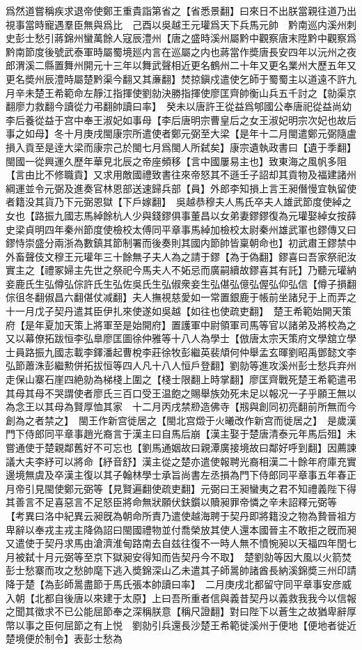爲然道嘗稱疾求退帝使鄭王重貴詣第省之【省悉景翻】曰來日不出朕當親往道乃出視事當時寵遇羣臣無與爲比　己酉以吳越王元瓘爲天下兵馬元帥　黔南巡内溪州刺史彭士愁引蔣錦州蠻萬餘人寇辰澧州【唐之盛時溪州屬黔中觀察唐末陞黔中觀察爲黔南節度後號武泰軍時屬蜀境廵内言在巡屬之内也蔣當作奬唐長安四年以沅州之夜郎渭溪二縣置舞州開元十三年以舞武聲相近更名鶴州二十年又更名業州大歷五年又更名奬州辰澧時屬楚黔渠今翻又其亷翻】焚掠鎭戍遣使乞師于蜀蜀主以道遠不許九月辛未楚王希範命左靜江指揮使劉勍決勝指揮使廖匡齊帥衡山兵五千討之【勍渠京翻廖力救翻今讀從力弔翻帥讀曰率】　癸未以唐許王從益爲郇國公奉唐祀從益尚幼李后養從益于宫中奉王淑妃如事母【李后唐明宗曹皇后之女王淑妃明宗次妃也故后事之如母】冬十月庚戌閩康宗所遣使者鄭元弼至大梁【是年十二月閩遣鄭元弼隨盧損入貢至是逹大梁而康宗己於閩七月爲閩人所弑矣】康宗遺執政書曰【遺于季翻】閩國一從興運久歷年華見北辰之帝座頻移【言中國屢易主也】致東海之風帆多阻【言由比不修職貢】又求用敵國禮致書往來帝怒其不遜壬子詔却其貢物及福建諸州綱運並令元弼及進奏官林恩部送速歸兵部【員】外郎李知損上言王昶僭慢宜執留使者籍没其貨乃下元弼恩獄【下戶嫁翻】　吳越恭穆夫人馬氏卒夫人雄武節度使綽之女也【路振九國志馬綽餘杭人少與錢鏐俱事董昌以女弟妻鏐鏐復為元瓘娶綽女按薛史梁貞明四年秦州節度使檢校太傅同平章事馬綽加檢校太尉秦州雄武軍也鏐傳又曰鏐恃崇盛分兩浙為數鎮其節制署而後奏則其國内節帥皆稟朝命也】初武肅王鏐禁中外畜聲伎文穆王元瓘年三十餘無子夫人為之請于鏐【為于偽翻】鏐喜曰吾家祭祀汝實主之【禮冢婦主先世之祭祀今馬夫人不妬忌而廣嗣續故鏐喜其有託】乃聽元瓘納妾鹿氏生弘僔弘倧許氏生弘佐吳氏生弘俶衆妾生弘偡弘億弘偓弘仰弘信【僔子損翻倧徂冬翻俶昌六翻偡仗减翻】夫人撫視慈愛如一常置銀鹿于帳前坐諸兒于上而弄之　十一月戊子契丹遣其臣伊扎來使遂如吳越【如往也使疏吏翻】　楚王希範始開天策府【是年夏加天策上將軍至是始開府】置護軍中尉領軍司馬等官以諸弟及將校為之又以幕僚拓跋恒李弘臯廖匡圖徐仲雅等十八人為學士【倣唐太宗天策府文學舘立學士員路振九國志載李鐸潘起曹梲李莊徐牧彭繼英裴頏何仲舉孟玄暉劉昭禹鄧懿文李弘節蕭洙彭繼勲併拓拔恒等四人凡十八人恒戶登翻】劉勍等進攻溪州彭士愁兵弃州走保山寨石崖四絶勍為梯棧上圍之【棧士限翻上時掌翻】廖匡齊戰死楚王希範遣弔其母其母不哭謂使者廖氏三百口受王温飽之賜舉族効死未足以報况一子乎願王無以為念王以其母為賢厚恤其家　十二月丙戌禁剙造佛寺【剏與創同初亮翻前所無而今創為之者禁之】　閩王作新宫徙居之【閩北宫燬于火曦改作新宫而徙居之】　是歲漢門下侍郎同平章事趙光裔言于漢主曰自馬后崩【漢主娶于楚唐清泰元年馬后殂】未嘗通使于楚親鄰舊好不可忘也【劉馬通姻故曰親潭廣接境故曰鄰好呼到翻】因薦諫議大夫李紓可以將命【紓音舒】漢主從之楚亦遣使報聘光裔相漢二十餘年府庫充實邊境無虞及卒漢主復以其子翰林學士承旨尚書左丞損為門下侍郎同平章事五年春正月帝引見閩使鄭元弼等【見賢遍翻使疏吏翻】元弼曰王昶蠻夷之君不知禮義陛下得其善言不足喜惡言不足怒臣將命無狀願伏鈇鑕以贖昶罪帝憐之辛未詔釋元弼等　【考異曰洛中紀異云昶旣為朝命所責乃遣使越海聘于契丹即將籍没之物為贄晉祖方卑辭以奉戎主戎主降偽詔曰閩國禮物並付喬榮放其使人還本國晉主不敢拒之旣而昶又遣使于契丹求馬由滄濟淮甸路南去自兹往復不一時人無不憤惋昶以天福四年閏七月被弑十月元弼等至京下獄昶安得知而告契丹今不取】　楚劉勍等因大風以火箭焚彭士愁寨而攻之愁帥麾下逃入奬錦深山乙未遣其子師暠帥諸酋長納溪錦奬三州印請降于楚【為彭師暠盡節于馬氏張本帥讀曰率】　二月庚戌北都留守同平章事安彦威入朝【北都自後唐以來建于太原】上曰吾所重者信與義昔契丹以義救我我今以信報之聞其徵求不已公能屈節奉之深稱朕意【稱尺證翻】對曰陛下以蒼生之故猶卑辭厚幣以事之臣何屈節之有上悦　劉勍引兵還長沙楚王希範徙溪州于便地【便地者徙近楚境便於制令】表彭士愁為
